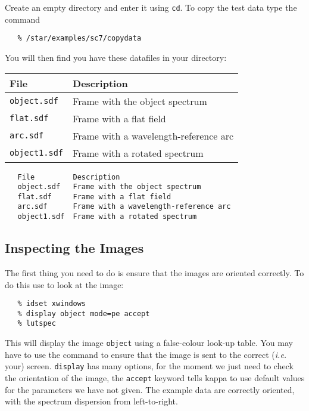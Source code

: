 Create an empty directory and enter it using \verb+cd+\@.
To copy the test data type the command

{
\scspec{\small}{ }
\begin{verbatim}
   % /star/examples/sc7/copydata
\end{verbatim}
}

You will then find you have these datafiles in your directory:

\begin{latexonly}
\begin{center}
\begin{tabular}{ll}
File & Description \\ \hline
{\tt object.sdf}  & Frame with the object spectrum\\
{\tt flat.sdf}    & Frame with a flat field\\
{\tt arc.sdf}     & Frame with a wavelength-reference arc\\
{\tt object1.sdf} & Frame with a rotated spectrum\\ \hline
\end{tabular}
\end{center}
\end{latexonly}
\begin{htmlonly}
\begin{verbatim}
   File         Description
   object.sdf   Frame with the object spectrum
   flat.sdf     Frame with a flat field
   arc.sdf      Frame with a wavelength-reference arc
   object1.sdf  Frame with a rotated spectrum
\end{verbatim}
\end{htmlonly}


\subsection{Inspecting the Images}

The first thing you need to do is ensure that the images are oriented
correctly.  To do this use 
 to look at the image:

{
\scspec{\small}{ }
\begin{verbatim}
   % idset xwindows
   % display object mode=pe accept
   % lutspec
\end{verbatim}
}

This will display the image \verb+object+ using a false-colour
look-up table.  You may have to use the
\cite{xdisplay} command to ensure
that the image is sent to the correct ({\it{i.e.}} your) screen.
\verb+display+ has many
options, for the moment we just need to check the orientation of the image,
the \verb+accept+ keyword tells {\sc kappa} to use default values for the
parameters we have not given.
The example data are correctly oriented, with the spectrum dispersion
from left-to-right.

